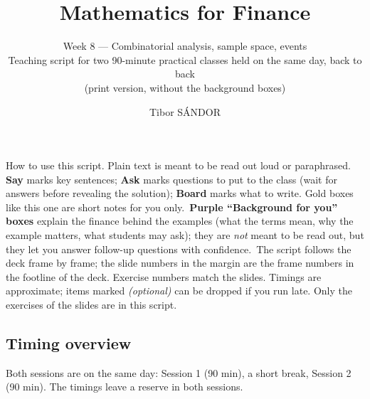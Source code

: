 \documentclass[11pt,a4paper,parskip=half]{scrartcl}
\title{Mathematics for Finance}
\subtitle{Week 8 --- Combinatorial analysis, sample space, events\\[2pt]
  \normalsize Teaching script for two 90-minute practical classes held on the
  same day, back to back\ifdefined\scriptprint\\[2pt]
  (print version, without the background boxes)\fi}
\author{Tibor SÁNDOR\\[2pt]
  \normalsize\href{mailto:\myemail}{\texttt{\myemail}}}
\begin{document}
\maketitle

\begin{cue}
	How to use this script. Plain text is meant to be read out loud or
	paraphrased. \textbf{Say} marks key sentences; \textbf{Ask} marks questions
	to put to the class (wait for answers before revealing the solution);
	\textbf{Board} marks what to write. Gold boxes like this one are short notes
	for you only.\ifdefined\scriptprint\else\ \textbf{Purple ``Background for
			you'' boxes} explain the finance behind the examples (what the terms mean,
		why the example matters, what students may ask); they are \emph{not} meant
		to be read out, but they let you answer follow-up questions with
		confidence.\fi\ The script follows the
	deck frame by frame; the slide numbers in the margin are the frame numbers
	in the footline of the deck. Exercise numbers match the slides.
	Timings are approximate; items marked \emph{(optional)} can be dropped if
	you run late. Only the exercises of the slides are in this script.
\end{cue}

\subsection*{Timing overview}

Both sessions are on the same day: Session 1 (90 min), a short break,
Session 2 (90 min). The timings leave a reserve in both sessions.
\end{document}
